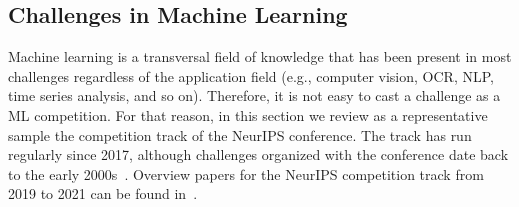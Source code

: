 \documentclass[twoside,11pt]{article}
\begin{document}
\subsection{Challenges in Machine Learning}

Machine learning is a transversal field of knowledge that has been present in most challenges regardless of the application field (e.g., computer vision, OCR, NLP, time series analysis, and so on). Therefore, it is not easy to cast a challenge as a ML competition. For that reason, in this section we review as a representative sample the competition track of the NeurIPS conference. The track has run regularly since 2017, although challenges organized with the conference date back to the early 2000s~\citep{NIPS2004_5e751896}. Overview papers for the NeurIPS competition track from 2019 to 2021 can be found in~\citep{DBLP:conf/nips/EscalanteH19,DBLP:conf/nips/EscalanteH20,pmlr-v176-kiela22a}. 
\end{document}

